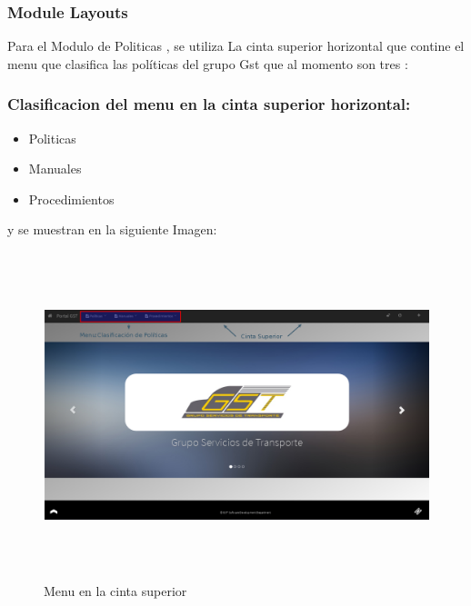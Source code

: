 \documentclass[12pt,letterpaper]{article}
\begin{document}
\newpage
\begin{section}{\color{kblue}}

	\begin{subsection}{\color{blackgreen}}
	\sffamily
	{
    \subsubsection{Module Layouts}
      Para el Modulo de Politicas , se utiliza La cinta superior horizontal que contine el menu que clasifica las pol\'iticas del grupo Gst que al momento son tres :
      \subsubsection{Clasificacion del menu en la cinta superior horizontal:}
  			\begin{itemize}
  				\item[\ding{182}]
  				{
  					Politicas
  				}
  				\item[\ding{183}]
  				{
  					Manuales
  				}
  				\item[\ding{184}]
  				{
  					Procedimientos
  				}
  	   \end{itemize}

      y se muestran en la siguiente Imagen:

      \begin{figure}[htb]
        \centering
        \includegraphics[angle=0,width=160mm,height=95mm]{img/Selection_037.png}
        \caption{Menu en la cinta superior}
        \label{menu}
      \end{figure}

}
\end{subsection}
\end{section}
\end{document}

